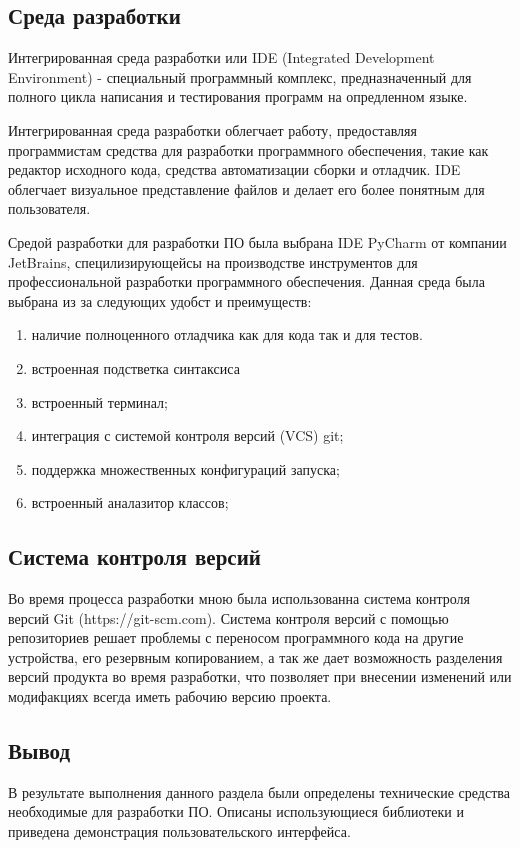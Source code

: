 \subsection{Среда разработки}
Интегрированная среда разработки или IDE (Integrated Development Environment) - специальный программный комплекс, предназначенный для полного цикла написания и тестирования программ на опредленном языке.

Интегрированная среда разработки облегчает работу, предоставляя программистам средства для разработки программного обеспечения, такие как редактор исходного кода, средства автоматизации сборки и отладчик. 
IDE облегчает визуальное представление файлов и делает его более понятным для пользователя.

Средой разработки для разработки ПО была выбрана IDE PyCharm от компании JetBrains, специлизирующейсы на производстве инструментов для профессиональной разработки программного обеспечения.
Данная среда была выбрана из за следующих удобст и преимуществ:
\begin{enumerate}
	\item наличие полноценного отладчика как для кода так и для тестов.
	\item встроенная подстветка синтаксиса
	\item встроенный терминал;
	\item интеграция с системой контроля версий (VCS) git;
	\item поддержка множественных конфигураций запуска;
	\item встроенный аналазитор классов;
\end{enumerate}

\subsection{Система контроля версий}
Во время процесса разработки мною была использованна система контроля версий Git (https://git-scm.com). 
Система контроля версий с помощью репозиториев решает проблемы с переносом программного кода на другие устройства, его резервным копированием, а так же дает возможность разделения версий продукта во время разработки, что позволяет при внесении изменений или модифакциях всегда иметь рабочию версию проекта.

\subsection{Вывод}
В результате выполнения данного раздела были определены технические средства необходимые для разработки ПО.
Описаны использующиеся библиотеки и приведена демонстрация пользовательского интерфейса.

